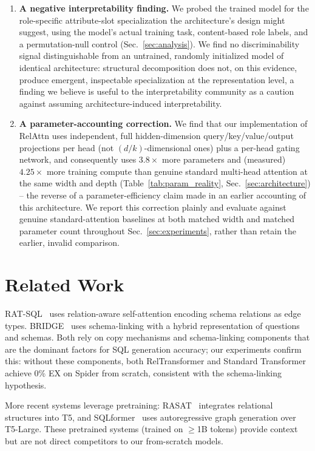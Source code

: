 \documentclass[review]{elsarticle}
\begin{document}
\begin{enumerate}[noitemsep,topsep=2pt]
  \item \textbf{A negative interpretability finding.} We probed the trained model for the role-specific attribute-slot specialization the architecture's design might suggest, using the model's actual training task, content-based role labels, and a permutation-null control (Sec.~\ref{sec:analysis}). We find no discriminability signal distinguishable from an untrained, randomly initialized model of identical architecture: structural decomposition does not, on this evidence, produce emergent, inspectable specialization at the representation level, a finding we believe is useful to the interpretability community as a caution against assuming architecture-induced interpretability.

  \item \textbf{A parameter-accounting correction.} We find that our implementation of RelAttn uses independent, full hidden-dimension query/key/value/output projections per head (not $(d/k)$-dimensional ones) plus a per-head gating network, and consequently uses $3.8\times$ more parameters and (measured) $4.25\times$ more training compute than genuine standard multi-head attention at the same width and depth (Table~\ref{tab:param_reality}, Sec.~\ref{sec:architecture}) -- the reverse of a parameter-efficiency claim made in an earlier accounting of this architecture. We report this correction plainly and evaluate against genuine standard-attention baselines at both matched width and matched parameter count throughout Sec.~\ref{sec:experiments}, rather than retain the earlier, invalid comparison.
\end{enumerate}

\section{Related Work}
\label{sec:related}

RAT-SQL~\cite{wang2020ratsql} uses relation-aware self-attention encoding schema relations as edge types. BRIDGE~\cite{lin2020bridging} uses schema-linking with a hybrid representation of questions and schemas. Both rely on copy mechanisms and schema-linking components that are the dominant factors for SQL generation accuracy; our experiments confirm this: without these components, both RelTransformer and Standard Transformer achieve 0\% EX on Spider from scratch, consistent with the schema-linking hypothesis.

More recent systems leverage pretraining: RASAT~\cite{qi2022rasat} integrates relational structures into T5, and SQLformer~\cite{bazaga2023sqlformer} uses autoregressive graph generation over T5-Large. These pretrained systems (trained on $\geq$1B tokens) provide context but are not direct competitors to our from-scratch models.
\end{document}
